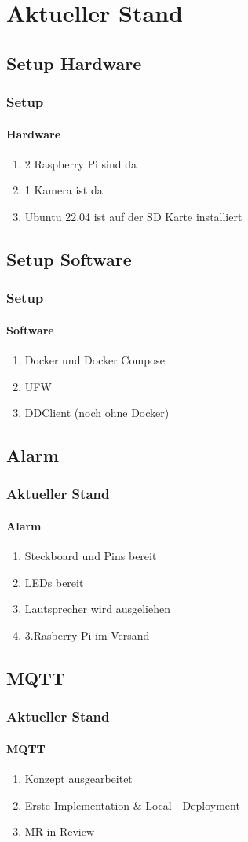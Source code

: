 \documentclass[]{beamer}
\begin{document}
\section{Aktueller Stand}
\subsection{Setup Hardware}
\begin{frame}
\frametitle{Setup}
\framesubtitle{Hardware}
\begin{enumerate}
    \item 2 Raspberry Pi sind da
    \item 1 Kamera ist da
    \item Ubuntu 22.04 ist auf der SD Karte installiert
\end{enumerate}
\end{frame}



\subsection{Setup Software}
\begin{frame}
\frametitle{Setup}
\framesubtitle{Software}

\begin{enumerate}
    \item Docker und Docker Compose
    \item UFW
    \item DDClient (noch ohne Docker)
\end{enumerate}
\end{frame}

\subsection{Alarm}
\begin{frame}
\frametitle{Aktueller Stand}
\framesubtitle{Alarm}
\begin{enumerate}
    \item Steckboard und Pins bereit
    \item LEDs bereit
    \item Lautsprecher wird ausgeliehen
    \item 3.Rasberry Pi im Versand 
\end{enumerate}
\end{frame}


\subsection{MQTT}
\begin{frame}
\frametitle{Aktueller Stand}
\framesubtitle{MQTT}
\begin{enumerate}
    \item Konzept ausgearbeitet
    \item Erste Implementation \& Local - Deployment
    \item MR in Review
\end{enumerate}
\end{frame}
\end{document}
